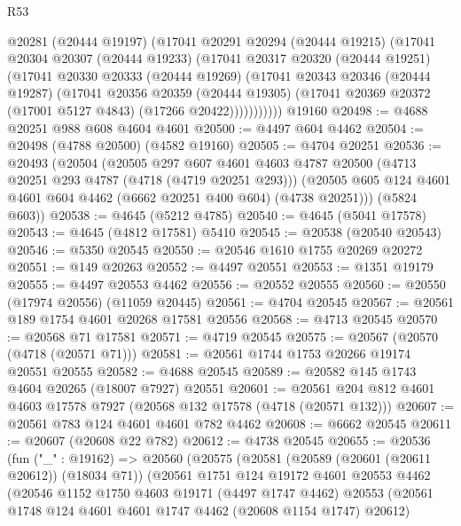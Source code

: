 \begin{lexlean}{R53}
\begin{coremodule}
          @20281
          (@20444 @19197)
          (@17041
            @20291
            @20294
            (@20444 @19215)
            (@17041
              @20304
              @20307
              (@20444 @19233)
              (@17041
                @20317
                @20320
                (@20444 @19251)
                (@17041
                  @20330
                  @20333
                  (@20444 @19269)
                  (@17041
                    @20343
                    @20346
                    (@20444 @19287)
                    (@17041
                      @20356
                      @20359
                      (@20444 @19305)
                      (@17041 @20369 @20372 (@17001 @5127 @4843) (@17266 @20422)))))))))))
    @19160
@20498 := @4688 @20251 @988 @608 @4604 @4601
@20500 := @4497 @604 @4462
@20504 := @20498 (@4788 @20500) (@4582 @19160)
@20505 := @4704 @20251
@20536 := @20493
    (@20504
      (@20505
        @297
        @607
        @4601
        @4603
        @4787
        @20500
        (@4713 @20251 @293 @4787 (@4718 (@4719 @20251 @293)))
        (@20505 @605 @124 @4601 @4601 @604 @4462 (@6662 @20251 @400 @604) (@4738 @20251)))
      (@5824 @603))
@20538 := @4645 (@5212 @4785)
@20540 := @4645 (@5041 @17578)
@20543 := @4645 (@4812 @17581) @5410
@20545 := @20538 (@20540 @20543)
@20546 := @5350 @20545
@20550 := @20546 @1610 @1755 @20269 @20272
@20551 := @149 @20263
@20552 := @4497 @20551
@20553 := @1351 @19179
@20555 := @4497 @20553 @4462
@20556 := @20552 @20555
@20560 := @20550 (@17974 @20556) (@11059 @20445)
@20561 := @4704 @20545
@20567 := @20561 @189 @1754 @4601 @20268 @17581 @20556
@20568 := @4713 @20545
@20570 := @20568 @71 @17581
@20571 := @4719 @20545
@20575 := @20567 (@20570 (@4718 (@20571 @71)))
@20581 := @20561 @1744 @1753 @20266 @19174 @20551 @20555
@20582 := @4688 @20545
@20589 := @20582 @145 @1743 @4604 @20265 (@18007 @7927) @20551
@20601 := @20561 @204 @812 @4601 @4603 @17578 @7927 (@20568 @132 @17578 (@4718 (@20571 @132)))
@20607 := @20561 @783 @124 @4601 @4601 @782 @4462
@20608 := @6662 @20545
@20611 := @20607 (@20608 @22 @782)
@20612 := @4738 @20545
@20655 := @20536
    (fun ("_" : @19162) =>
    @20560
      (@20575
        (@20581
          (@20589 (@20601 (@20611 @20612)) (@18034 @71))
          (@20561
            @1751
            @124
            @19172
            @4601
            @20553
            @4462
            (@20546
              @1152
              @1750
              @4603
              @19171
              (@4497 @1747 @4462)
              @20553
              (@20561 @1748 @124 @4601 @4601 @1747 @4462 (@20608 @1154 @1747) @20612)

\end{coremodule}
\end{lexlean}
